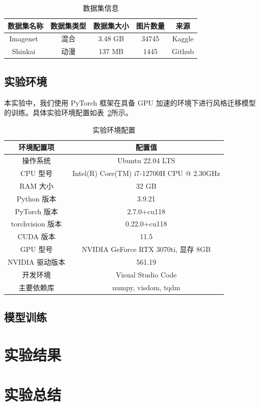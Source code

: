 \documentclass[UTF8,openany]{ctexbook}
\begin{document}
\begin{table}[H]
    \centering
    \caption{数据集信息}
    \label{tab:dataset}
    \begin{tabular}{ccccc}
        \toprule
        数据集名称 & 数据集类型 & 数据集大小 & 图片数量 & 来源 \\ \midrule
        Imagenet~\cite{deng2009imagenet}  & 混合 & 3.48 GB & 34745 & Kaggle   \\
        Shinkai~\cite{Liu2024dtgan}  & 动漫 & 137 MB & 1445 & Github  \\ \bottomrule
    \end{tabular}
\end{table}

\section{实验环境}
\label{sec:env}

本实验中，我们使用 PyTorch 框架在具备 GPU 加速的环境下进行风格迁移模型的训练。具体实验环境配置如表~\ref{tab:env}所示。

\begin{table}[H]
    \centering
    \caption{实验环境配置}
    \label{tab:env}
    \begin{tabular}{cc}
        \toprule
        环境配置项 & 配置值 \\ \midrule
        操作系统 & Ubuntu 22.04 LTS \\
        CPU 型号 & Intel(R) Core(TM) i7-12700H CPU @ 2.30GHz \\
        RAM 大小 & 32 GB \\
        Python 版本 & 3.9.21 \\
        PyTorch 版本 & 2.7.0+cu118 \\
        torchvision 版本 & 0.22.0+cu118 \\
        CUDA 版本 & 11.5 \\
        GPU 型号 & NVIDIA GeForce RTX 3070ti, 显存 8GB \\
        NVIDIA 驱动版本 & 561.19 \\ 
        开发环境 & Visual Studio Code \\ 
        主要依赖库 & numpy, visdom, tqdm \\ \bottomrule
    \end{tabular}
\end{table}

\section{模型训练}
\label{sec:model}




\chapter{实验结果}


\chapter{实验总结}



\end{document}
